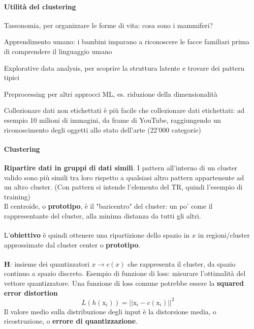 \documentclass[10pt]{book}
\begin{document}
\paragraph{Utilità del clustering} \begin{list}{}{In natura:}
	\item Tassonomia, per organizzare le forme di vita: cosa sono i mammiferi?
	\item Apprendimento umano: i bambini imparano a riconoscere le facce familiari prima di comprendere il linguaggio umano
\end{list}
\begin{list}{}{In \textbf{data analysis}:}
	\item Explorative data analysis, per scoprire la struttura latente e trovare dei pattern tipici
	\item Preprocessing per altri approcci ML, es. riduzione della dimensionalità
	\item Collezionare dati non etichettati è più facile che collezionare dati etichettati: ad esempio 10 milioni di immagini, da frame di YouTube, raggiungendo un riconoscimento degli oggetti allo stato dell'arte (22'000 categorie)
\end{list}
\paragraph{Clustering} \textbf{Ripartire dati in gruppi di dati simili}. I pattern all'interno di un cluster valido sono più simili tra loro rispetto a qualsiasi altro pattern appartenente ad un altro cluster. (Con pattern si intende l'elemento del TR, quindi l'esempio di training)\\
Il centroide, o \textbf{prototipo}, è il "baricentro" del cluster: un po' come il rappresentante del cluster, alla minima distanza da tutti gli altri.\\\\
L'\textbf{obiettivo} è quindi ottenere una ripartizione dello spazio in $x$ in regioni/cluster approssimate dal cluster center o \textbf{prototipo}.\\\\
\textbf{H}: insieme dei quantizzatori $x\rightarrow c(x)$ che rappresenta il cluster, da spazio continuo a spazio discreto. Esempio di funzione di loss: misurare l'ottimalità del vettore quantizzatore. Una funzione di loss comune potrebbe essere la \textbf{squared error distortion}$$L(h(\text{x}_i)) = ||\text{x}_i - c(\text{x}_i)||^2$$
Il valore medio sulla distribuzione degli input è la distorsione media, o ricostruzione, o \textbf{errore di quantizzazione}.
\end{document}
